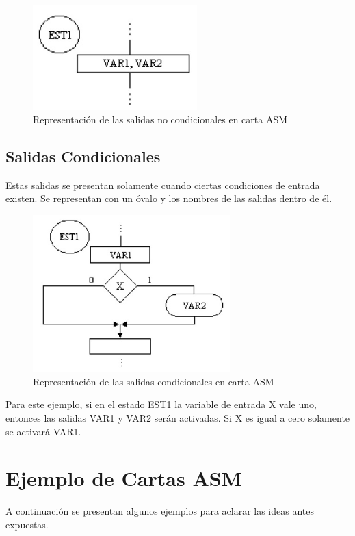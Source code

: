 \documentclass[12pt]{book}
\theoremstyle{definition}
\theoremstyle{remark}
\theoremstyle{plain}
\begin{document}
\begin{figure}
\centering
\includegraphics[width=2.5in]{ASMnocondicional.jpg}
\caption{Representación de las salidas no condicionales en carta ASM}
\label{fig16}
\end{figure}

\subsection{Salidas Condicionales}

Estas salidas se presentan solamente cuando ciertas condiciones de
entrada existen. Se representan con un óvalo y los nombres de las salidas dentro de él.

\begin{figure}
\centering
\includegraphics[width=3in]{ASMcondicional.jpg}
\caption{Representación de las salidas condicionales en carta ASM}
\label{fig17}
\end{figure}

Para este ejemplo, si en el estado EST1 la variable de entrada X vale uno, entonces las salidas
VAR1 y VAR2 serán activadas. Si X es igual a cero solamente se activará VAR1.

\section{Ejemplo de Cartas ASM}

A continuación se presentan algunos ejemplos para aclarar las ideas antes expuestas.
\end{document}
